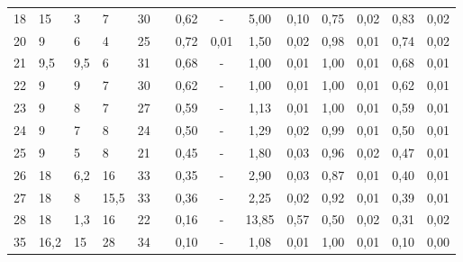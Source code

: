 \documentclass[a4paper,12pt]{report}
\begin{document}
\begin{table}[H]
\begin{center}
\begin{tabular}{|p{0.8cm}|p{0.6cm}|p{0.6cm}|p{0.6cm}|p{0.6cm}|c|c|c|c|c|c|c|c|c|}
18    & 15      & 3       & 7       & 30      &                        & 0,62  & -        & 5,00  & 0,10        & 0,75         & 0,02               & 0,83         & 0,02               \\ \cline{1-5} \cline{7-14} 
20    & 9       & 6       & 4       & 25      &                        & 0,72  & 0,01        & 1,50  & 0,02        & 0,98         & 0,01               & 0,74         & 0,02               \\ \cline{1-5} \cline{7-14} 
21    & 9,5     & 9,5     & 6       & 31      &                        & 0,68  & -        & 1,00  & 0,01        & 1,00         & 0,01               & 0,68         & 0,01               \\ \cline{1-5} \cline{7-14} 
22    & 9       & 9       & 7       & 30      &                        & 0,62  & -        & 1,00  & 0,01        & 1,00         & 0,01               & 0,62         & 0,01               \\ \cline{1-5} \cline{7-14} 
23    & 9       & 8       & 7       & 27      &                        & 0,59  & -        & 1,13  & 0,01        & 1,00         & 0,01               & 0,59         & 0,01               \\ \cline{1-5} \cline{7-14} 
24    & 9       & 7       & 8       & 24      &                        & 0,50  & -        & 1,29  & 0,02        & 0,99         & 0,01               & 0,50         & 0,01               \\ \cline{1-5} \cline{7-14} 
25    & 9       & 5       & 8       & 21      &                        & 0,45  & -        & 1,80  & 0,03        & 0,96         & 0,02               & 0,47         & 0,01               \\ \cline{1-5} \cline{7-14} 
26    & 18      & 6,2     & 16      & 33      &                        & 0,35  & -        & 2,90  & 0,03        & 0,87         & 0,01               & 0,40         & 0,01               \\ \cline{1-5} \cline{7-14} 
27    & 18      & 8       & 15,5    & 33      &                        & 0,36  & -        & 2,25  & 0,02        & 0,92         & 0,01               & 0,39         & 0,01               \\ \cline{1-5} \cline{7-14} 
28    & 18      & 1,3     & 16      & 22      &                        & 0,16  & -        & 13,85 & 0,57        & 0,50         & 0,02               & 0,31         & 0,02               \\ \cline{1-5} \cline{7-14} 
35    & 16,2    & 15      & 28      & 34      &                        & 0,10  & -        & 1,08  & 0,01        & 1,00         & 0,01               & 0,10         & 0,00               \\ \cline{1-5} \cline{7-14} 

\end{tabular}
\end{center}
\end{table}
\end{document}
